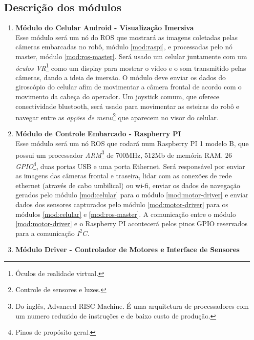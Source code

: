 \documentclass[12pt,a4paper]{article}
\begin{document}
\subsection{Descrição dos módulos \label{sec:desc-modulos}}
\begin{enumerate}
\item \textbf{Módulo do Celular Android - Visualização Imersiva\label{mod:celular}}\\
	Esse módulo será um nó do ROS que mostrará as imagens coletadas pelas câmeras embarcadas no robô, módulo \ref{mod:raspi}, e processadas pelo nó master, módulo \ref{mod:ros-master}. Será usado um celular juntamente com um \emph{óculos VR}\footnote{Óculos de realidade virtual.} como um display para mostrar o vídeo e o som transmitido pelas câmeras, dando a ideia de imersão. O módulo deve enviar os dados do giroscópio do celular afim de movimentar a câmera frontal de acordo com o movimento da cabeça do operador. Um joystick comum, que oferece conectividade bluetooth, será usado para movimentar as esteiras do robô e navegar entre as \emph{opções de menu}\footnote{Controle de sensores e luzes.} que aparecem no visor do celular.
\item \textbf{Módulo de Controle Embarcado - Raspberry PI\label{mod:raspi}}\\
	Esse módulo será um nó ROS que rodará num Raspberry PI 1 modelo B, que possui um processador \emph{ARM}\footnote{Do inglês, Advanced RISC Machine. É uma arquitetura de processadores com um numero reduzido de instruções e de baixo custo de produção.} de 700MHz, 512Mb de memória RAM, 26 \emph{GPIO}\footnote{Pinos de propósito geral.}, duas portas USB e uma porta Ethernet. Será responsável por enviar as imagens das câmeras frontal e traseira, lidar com as conexões de rede ethernet (através de cabo umbilical) ou wi-fi, enviar os dados de navegação gerados pelo módulo \ref{mod:celular} para o módulo \ref{mod:motor-driver} e enviar dados dos sensores capturados pelo módulo \ref{mod:motor-driver} para os módulos \ref{mod:celular} e \ref{mod:ros-master}. A comunicação entre o módulo \ref{mod:motor-driver} e o Raspberry PI acontecerá pelos pinos GPIO reservados para a comunicação $I^2C$.
\item \textbf{Módulo Driver - Controlador de Motores e Interface de Sensores\label{mod:motor-driver}}\\

\end{enumerate}
\end{document}
